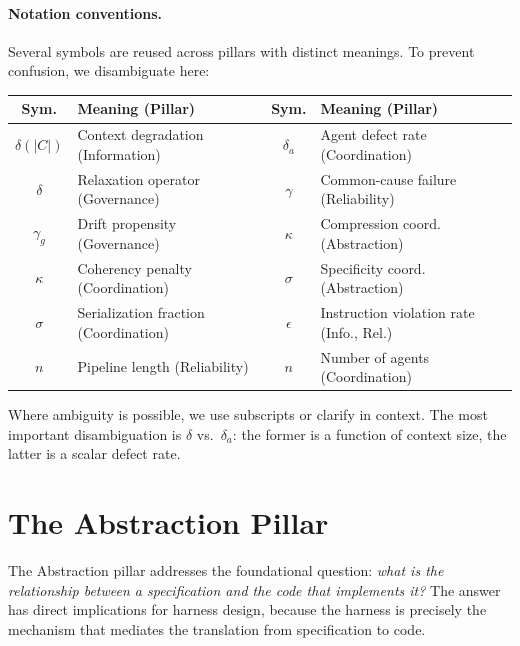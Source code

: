 \documentclass[11pt, a4paper, logo, copyright]{googledeepmind}
\begin{document}
\paragraph{Notation conventions.} Several symbols are reused across pillars with distinct meanings. To prevent confusion, we disambiguate here:

\begin{center}
\footnotesize
\begin{tabular}{cp{5.5cm}cp{5.5cm}}
\toprule
\textbf{Sym.} & \textbf{Meaning (Pillar)} & \textbf{Sym.} & \textbf{Meaning (Pillar)} \\
\midrule
$\delta(|C|)$ & Context degradation (Information) & $\delta_a$ & Agent defect rate (Coordination) \\
$\delta$ & Relaxation operator (Governance) & $\gamma$ & Common-cause failure (Reliability) \\
$\gamma_g$ & Drift propensity (Governance) & $\kappa$ & Compression coord. (Abstraction) \\
$\kappa$ & Coherency penalty (Coordination) & $\sigma$ & Specificity coord. (Abstraction) \\
$\sigma$ & Serialization fraction (Coordination) & $\epsilon$ & Instruction violation rate (Info., Rel.) \\
$n$ & Pipeline length (Reliability) & $n$ & Number of agents (Coordination) \\
\bottomrule
\end{tabular}
\end{center}
Where ambiguity is possible, we use subscripts or clarify in context. The most important disambiguation is $\delta$ vs.\ $\delta_a$: the former is a function of context size, the latter is a scalar defect rate.


\section{The Abstraction Pillar}
\label{sec:abstraction}

The Abstraction pillar addresses the foundational question: \emph{what is the relationship between a specification and the code that implements it?} The answer has direct implications for harness design, because the harness is precisely the mechanism that mediates the translation from specification to code.
\end{document}
